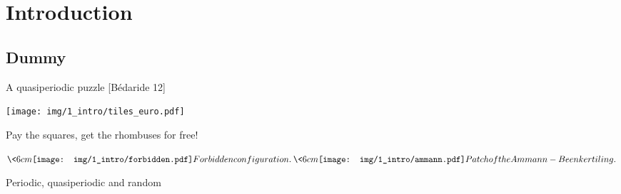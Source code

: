 \section{Introduction}
\subsection{Dummy}

\begin{frame}{A quasiperiodic puzzle [Bédaride \etal{} 12]}

\centering
\texttt{[image: img/1\_intro/tiles\_euro.pdf]}

Pay the squares, get the rhombuses for free!

\(
\<{6cm}
\centering
\texttt{[image: img/1\_intro/forbidden.pdf]}

Forbidden configuration.
\>

\<{6cm}
\centering
\texttt{[image: img/1\_intro/ammann.pdf]}

Patch of the Ammann-Beenker tiling.
\>
\)
\end{frame}

\begin{frame}{Periodic, quasiperiodic and random}
\centering
{}


\end{frame}

%
%
%

